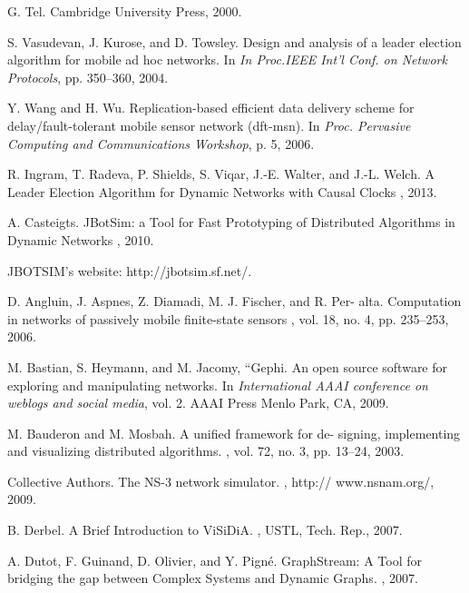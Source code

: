 \begin{thebibliography}{1}
	G. Tel.
	\newblock Cambridge University Press, 2000.
	
	S. Vasudevan, J. Kurose, and D. Towsley.
	\newblock Design and analysis of a leader election algorithm for mobile ad hoc networks.
	\newblock In {\em In Proc.IEEE Int’l Conf. on Network Protocols}, pp. 350–360, 2004.
	
	Y. Wang and H. Wu.
	\newblock Replication-based efficient data delivery scheme for delay/fault-tolerant mobile sensor network (dft-msn).
	\newblock In {\em Proc. Pervasive Computing and Communications Workshop}, p. 5, 2006.
	
	R. Ingram, T. Radeva, P. Shields, S. Viqar, J.-E. Walter, and J.-L. Welch.
	\newblock A Leader Election Algorithm for Dynamic Networks with Causal Clocks
	\newblock , 2013.
	
	A. Casteigts.
	\newblock JBotSim: a Tool for Fast Prototyping of Distributed Algorithms in Dynamic Networks
	\newblock , 2010.
	
	JBOTSIM’s website: http://jbotsim.sf.net/.
	
	
	D. Angluin, J. Aspnes, Z. Diamadi, M. J. Fischer, and R. Per- alta.
	\newblock Computation in networks of passively mobile finite-state sensors
	\newblock, vol. 18, no. 4, pp. 235–253, 2006.
	
	M. Bastian, S. Heymann, and M. Jacomy, “Gephi.
	\newblock An open source software for exploring and manipulating networks.
	\newblock In {\em International AAAI conference on weblogs and social media}, vol. 2. AAAI Press Menlo Park, CA, 2009.
	
	M. Bauderon and M. Mosbah.
	\newblock A unified framework for de- signing, implementing and visualizing distributed algorithms.
	, vol. 72, no. 3, pp. 13–24, 2003.
	
	Collective Authors.
	\newblock The NS-3 network simulator.
	\newblock , http:// www.nsnam.org/, 2009.
	
	B. Derbel.
	\newblock A Brief Introduction to ViSiDiA.
	\newblock , USTL, Tech. Rep., 2007.
	
	A. Dutot, F. Guinand, D. Olivier, and Y. Pigné.
	\newblock GraphStream: A Tool for bridging the gap between Complex Systems and Dynamic Graphs.
	, 2007.
	

\end{thebibliography}
